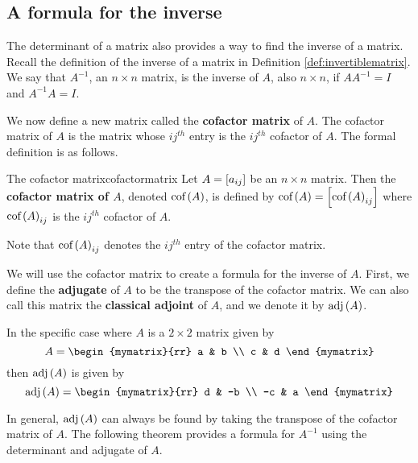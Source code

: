 \subsection{A formula for the inverse}

The determinant of a matrix also provides a way to find the inverse of a matrix.
Recall the definition of the inverse of a matrix in Definition \ref{def:invertiblematrix}.
We say that $A^{-1}$, an $n \times n$ matrix, is the inverse of $A$, also $n \times n$, if $AA^{-1} = I$ and $A^{-1}A=I$. 

We now define a new matrix called the \textbf{cofactor matrix} of $A$.  
The cofactor matrix of $A$ is the matrix whose $ij^{th}$ entry is the $ij^{th}$ cofactor of $A$.
The formal definition is as follows.

\begin{definition}{The cofactor matrix}{cofactormatrix}
Let $A=\left[a_{ij}\right]$ be an $n\times n$ matrix. Then the
\textbf{cofactor matrix of $A$}, denoted 
$\mbox{cof}\left(A\right)$, is defined by $\mbox{cof}\left(A\right) =\left[
\mbox{cof}\left(A\right)_{ij}\right] $ where  $\mbox{cof}\left(A\right)_{ij}$ is the $ij^{th}$ cofactor of $A$.
\end{definition}

Note that $\mbox{cof}\left(A\right)_{ij}$ denotes the $ij^{th}$ entry of the cofactor matrix.

We will use the cofactor matrix to create a formula for the inverse of $A$. First,
we define the \textbf{adjugate} of $A$ to be the transpose of 
the cofactor matrix. We can also call this matrix the \textbf{classical adjoint} of $A$,
and we denote it by $\mbox{adj} \left(A\right)$. 

In the specific case where $A$ is a $2 \times 2$ matrix given by
\begin{equation*}
A = \begin{mymatrix}{rr}
a & b \\
c & d
\end{mymatrix}
\end{equation*}
then $\mbox{adj}\left(A\right)$ is given by
\begin{equation*}
\func{adj}\tup{A} = 
\begin{mymatrix}{rr}
d & -b \\
-c & a
\end{mymatrix}
\end{equation*}

In general, $\mbox{adj}\left(A\right)$ can always be found by taking the transpose of the cofactor matrix of $A$. The following theorem provides a formula for $A^{-1}$ using the determinant and adjugate of $A$.

